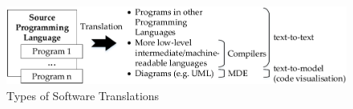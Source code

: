 \begin{figure}[!tb]
\begin{center}
\includegraphics[width=.85\textwidth]{img/software_trans/software_trans2.pdf}
\end{center}
\caption{Types of Software Translations}
\label{fig:sec-compl-software-trans:software_trans_types}
\end{figure}
